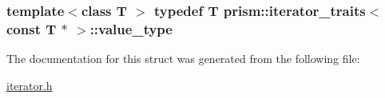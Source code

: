 \subsubsection[{\texorpdfstring{value\+\_\+type}{value_type}}]{\setlength{\rightskip}{0pt plus 5cm}template$<$class T $>$ typedef T {\bf prism\+::iterator\+\_\+traits}$<$ const T $\ast$ $>$\+::{\bf value\+\_\+type}}\hypertarget{structprism_1_1iterator__traits_3_01const_01_t_01_5_01_4_a0c805774795fde0ece3dd34a8583740b}{}\label{structprism_1_1iterator__traits_3_01const_01_t_01_5_01_4_a0c805774795fde0ece3dd34a8583740b}


The documentation for this struct was generated from the following file\+:\begin{DoxyCompactItemize}
\item 
\hyperlink{iterator_8h}{iterator.\+h}\end{DoxyCompactItemize}
